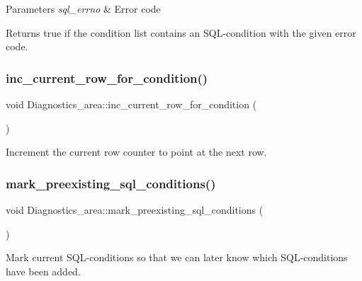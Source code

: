 \begin{DoxyParams}{Parameters}
{\em sql\+\_\+errno} & Error code\\
\hline
\end{DoxyParams}
\begin{DoxyReturn}{Returns}
true if the condition list contains an S\+QL-\/condition with the given error code. 
\end{DoxyReturn}
\mbox{\label{classDiagnostics__area_a06030bceccad3221fa9bece84682e22f}} 
\subsubsection{\texorpdfstring{inc\+\_\+current\+\_\+row\+\_\+for\+\_\+condition()}{inc\_current\_row\_for\_condition()}}
{\footnotesize\ttfamily void Diagnostics\+\_\+area\+::inc\+\_\+current\+\_\+row\+\_\+for\+\_\+condition (\begin{DoxyParamCaption}{ }\end{DoxyParamCaption})\hspace{0.3cm}{\ttfamily [inline]}}

Increment the current row counter to point at the next row. \mbox{\label{classDiagnostics__area_a49941326d0fd428be3f52eb3349419ca}} 
\subsubsection{\texorpdfstring{mark\+\_\+preexisting\+\_\+sql\+\_\+conditions()}{mark\_preexisting\_sql\_conditions()}}
{\footnotesize\ttfamily void Diagnostics\+\_\+area\+::mark\+\_\+preexisting\+\_\+sql\+\_\+conditions (\begin{DoxyParamCaption}{ }\end{DoxyParamCaption})}

Mark current S\+QL-\/conditions so that we can later know which S\+QL-\/conditions have been added. \mbox{\label{classDiagnostics__area_a19c274a315f6a7f9c40618befd62d530}} 
